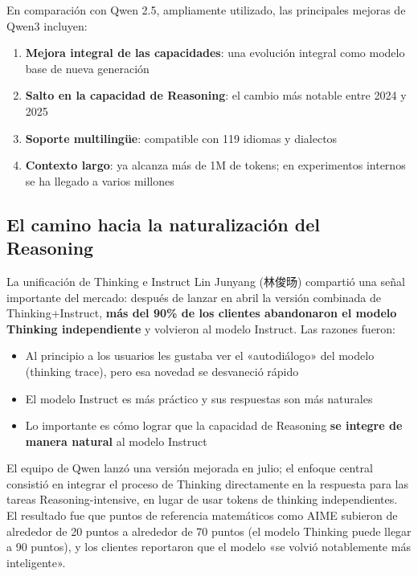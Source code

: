 \documentclass[a4paper]{article}
\begin{document}
En comparación con Qwen 2.5, ampliamente utilizado, las principales mejoras de Qwen3 incluyen:

\begin{enumerate}
    \item \textbf{Mejora integral de las capacidades}: una evolución integral como modelo base de nueva generación
    \item \textbf{Salto en la capacidad de Reasoning}: el cambio más notable entre 2024 y 2025
    \item \textbf{Soporte multilingüe}: compatible con 119 idiomas y dialectos
    \item \textbf{Contexto largo}: ya alcanza más de 1M de tokens; en experimentos internos se ha llegado a varios millones
\end{enumerate}

\subsection{El camino hacia la naturalización del Reasoning}

\begin{importantbox}{La unificación de Thinking e Instruct}
Lin Junyang (林俊旸) compartió una señal importante del mercado: después de lanzar en abril la versión combinada de Thinking+Instruct, \textbf{más del 90\% de los clientes abandonaron el modelo Thinking independiente} y volvieron al modelo Instruct. Las razones fueron:
\begin{itemize}
    \item Al principio a los usuarios les gustaba ver el «autodiálogo» del modelo (thinking trace), pero esa novedad se desvaneció rápido
    \item El modelo Instruct es más práctico y sus respuestas son más naturales
    \item Lo importante es cómo lograr que la capacidad de Reasoning \textbf{se integre de manera natural} al modelo Instruct
\end{itemize}
\end{importantbox}

El equipo de Qwen lanzó una versión mejorada en julio; el enfoque central consistió en integrar el proceso de Thinking directamente en la respuesta para las tareas Reasoning-intensive, en lugar de usar tokens de thinking independientes. El resultado fue que puntos de referencia matemáticos como AIME subieron de alrededor de 20 puntos a alrededor de 70 puntos (el modelo Thinking puede llegar a 90 puntos), y los clientes reportaron que el modelo «se volvió notablemente más inteligente».
\end{document}

